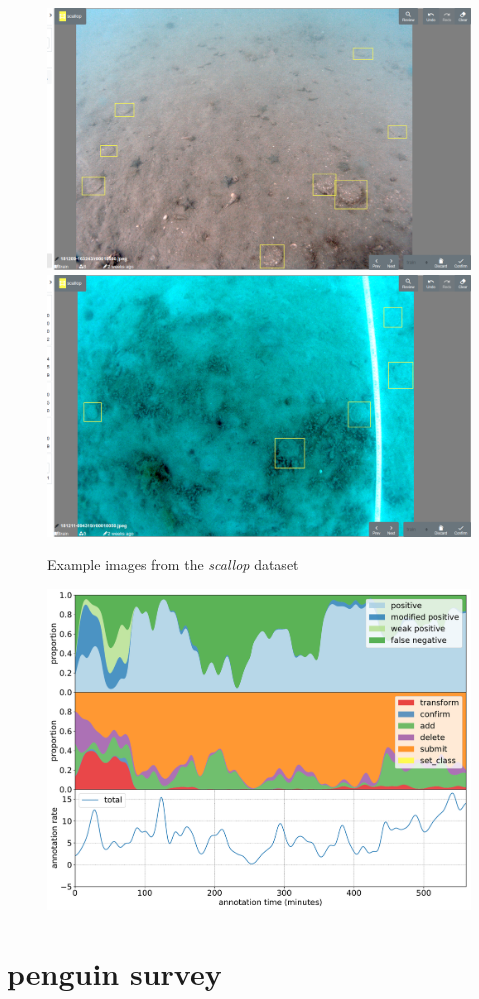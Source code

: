 \begin{figure}[!h]
  \includegraphics[width=0.475\linewidth]{figures/annotation/screenshots/scallops.png}
  \hfill
  \includegraphics[width=0.475\linewidth]{figures/annotation/screenshots/scallops3.png}
\caption{Example images from the \emph{scallop} dataset}
\label{fig:scallop_dataset}  
\end{figure}

\begin{figure}[!h]
\centering
\includegraphics[width=1.0\linewidth]{charts/action_annotations/scallops.pdf}
\caption{  }
\label{fig:scallop_annotation}
\end{figure}

\pagebreak
\section {penguin survey}


